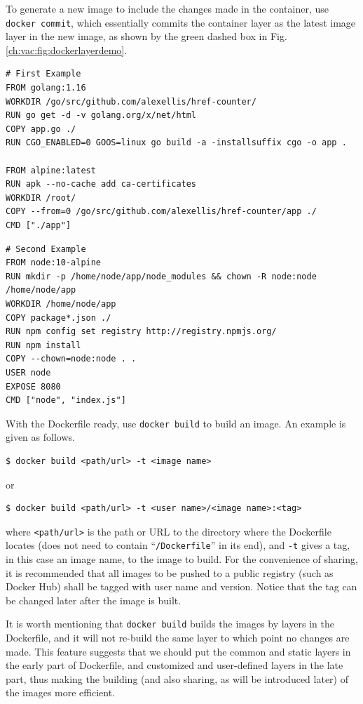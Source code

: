 To generate a new image to include the changes made in the container, use \verb|docker commit|, which essentially commits the container layer as the latest image layer in the new image, as shown by the green dashed box in Fig. \ref{ch:vac:fig:dockerlayerdemo}.

\begin{lstlisting}
# First Example
FROM golang:1.16
WORKDIR /go/src/github.com/alexellis/href-counter/
RUN go get -d -v golang.org/x/net/html
COPY app.go ./
RUN CGO_ENABLED=0 GOOS=linux go build -a -installsuffix cgo -o app .

FROM alpine:latest
RUN apk --no-cache add ca-certificates
WORKDIR /root/
COPY --from=0 /go/src/github.com/alexellis/href-counter/app ./
CMD ["./app"]
\end{lstlisting}

\begin{lstlisting}
# Second Example
FROM node:10-alpine
RUN mkdir -p /home/node/app/node_modules && chown -R node:node /home/node/app
WORKDIR /home/node/app
COPY package*.json ./
RUN npm config set registry http://registry.npmjs.org/
RUN npm install
COPY --chown=node:node . .
USER node
EXPOSE 8080
CMD ["node", "index.js"]
\end{lstlisting}

With the Dockerfile ready, use \verb|docker build| to build an image. An example is given as follows.
\begin{lstlisting}
$ docker build <path/url> -t <image name>
\end{lstlisting}
or
\begin{lstlisting}
$ docker build <path/url> -t <user name>/<image name>:<tag>
\end{lstlisting}
where \verb|<path/url>| is the path or URL to the directory where the Dockerfile locates (does not need to contain ``\verb|/Dockerfile|'' in its end), and \verb|-t| gives a tag, in this case an image name, to the image to build. For the convenience of sharing, it is recommended that all images to be pushed to a public registry (such as Docker Hub) shall be tagged with user name and version. Notice that the tag can be changed later after the image is built.

It is worth mentioning that \verb|docker build| builds the images by layers in the Dockerfile, and it will not re-build the same layer to which point no changes are made. This feature suggests that we should put the common and static layers in the early part of Dockerfile, and customized and user-defined layers in the late part, thus making the building (and also sharing, as will be introduced later) of the images more efficient.

